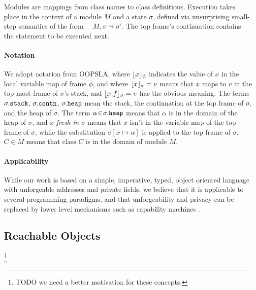  
Modules are mappings from class names to class definitions. 
Execution 
takes place
 in the context of  a module $M$ and   a state $\sigma$,
 defined via unsurprising small-step semantics of the form \ \ 
   $M, \sigma \leadsto \sigma'$.
The   top frame's continuation contains the statement to be 
executed next.  

\paragraph{Notation} We adopt notation from OOPSLA, where
 $\lfloor x \rfloor_{\phi}$  indicates the value of $x$   in the local variable map of frame $\phi$, 
 and where $\lfloor x \rfloor_{\sigma} = v$ means that $x$ 
maps to $v$ in the top-most frame of $\sigma$'s stack, and $\lfloor x.f \rfloor_{\sigma} = v$
has the obvious meaning. The terms $\sigma.{\texttt{stack}}$,  
$\sigma.{\texttt{contn}}$,  
$\sigma.{\texttt{heap}}$     mean the stack, 
the continuation at the
top frame of $\sigma$, %
and the heap of $\sigma$.
The term $\alpha\!\in\!\sigma.{\texttt{heap}}$ means that $\alpha$ is in the domain of the heap of $\sigma$, and \emph{$x$ fresh in $\sigma$} means that 
$x$ isn't in the variable map of the top frame of $\sigma$, 
while the substitution  $\sigma[x \mapsto \alpha]$ is applied to the top frame of $\sigma$.
 \ $C\in M$ means that class $C$ is in the domain of module $M$. 


\paragraph{Applicability} 
{While our work is based on 
  a simple, imperative, typed, object oriented}
language with unforgeable addresses and private fields, we believe
 that %
 it is applicable to several programming paradigms, and 
 that   unforgeability and privacy
 can be replaced 
 by lower level mechanisms such as capability machines \cite{vanproving,davis2019cheriabi}.

  \subsection{{Reachable  Objects}}
  
\footnote{TODO we need a better motivation for these concepts.}
 



